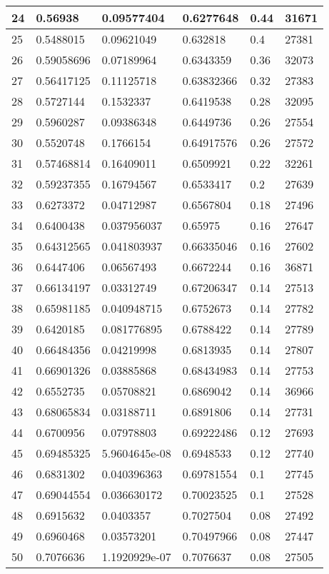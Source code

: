 \begin{longtable}{|l|l|l|l|l|l|}
24 & 0.56938 & 0.09577404 & 0.6277648 & 0.44 & 31671 \\ \hline 
25 & 0.5488015 & 0.09621049 & 0.632818 & 0.4 & 27381 \\ \hline 
26 & 0.59058696 & 0.07189964 & 0.6343359 & 0.36 & 32073 \\ \hline 
27 & 0.56417125 & 0.11125718 & 0.63832366 & 0.32 & 27383 \\ \hline 
28 & 0.5727144 & 0.1532337 & 0.6419538 & 0.28 & 32095 \\ \hline 
29 & 0.5960287 & 0.09386348 & 0.6449736 & 0.26 & 27554 \\ \hline 
30 & 0.5520748 & 0.1766154 & 0.64917576 & 0.26 & 27572 \\ \hline 
31 & 0.57468814 & 0.16409011 & 0.6509921 & 0.22 & 32261 \\ \hline 
32 & 0.59237355 & 0.16794567 & 0.6533417 & 0.2 & 27639 \\ \hline 
33 & 0.6273372 & 0.04712987 & 0.6567804 & 0.18 & 27496 \\ \hline 
34 & 0.6400438 & 0.037956037 & 0.65975 & 0.16 & 27647 \\ \hline 
35 & 0.64312565 & 0.041803937 & 0.66335046 & 0.16 & 27602 \\ \hline 
36 & 0.6447406 & 0.06567493 & 0.6672244 & 0.16 & 36871 \\ \hline 
37 & 0.66134197 & 0.03312749 & 0.67206347 & 0.14 & 27513 \\ \hline 
38 & 0.65981185 & 0.040948715 & 0.6752673 & 0.14 & 27782 \\ \hline 
39 & 0.6420185 & 0.081776895 & 0.6788422 & 0.14 & 27789 \\ \hline 
40 & 0.66484356 & 0.04219998 & 0.6813935 & 0.14 & 27807 \\ \hline 
41 & 0.66901326 & 0.03885868 & 0.68434983 & 0.14 & 27753 \\ \hline 
42 & 0.6552735 & 0.05708821 & 0.6869042 & 0.14 & 36966 \\ \hline 
43 & 0.68065834 & 0.03188711 & 0.6891806 & 0.14 & 27731 \\ \hline 
44 & 0.6700956 & 0.07978803 & 0.69222486 & 0.12 & 27693 \\ \hline 
45 & 0.69485325 & 5.9604645e-08 & 0.6948533 & 0.12 & 27740 \\ \hline 
46 & 0.6831302 & 0.040396363 & 0.69781554 & 0.1 & 27745 \\ \hline 
47 & 0.69044554 & 0.036630172 & 0.70023525 & 0.1 & 27528 \\ \hline 
48 & 0.6915632 & 0.0403357 & 0.7027504 & 0.08 & 27492 \\ \hline 
49 & 0.6960468 & 0.03573201 & 0.70497966 & 0.08 & 27447 \\ \hline 
50 & 0.7076636 & 1.1920929e-07 & 0.7076637 & 0.08 & 27505 \\ \hline 
\end{longtable}